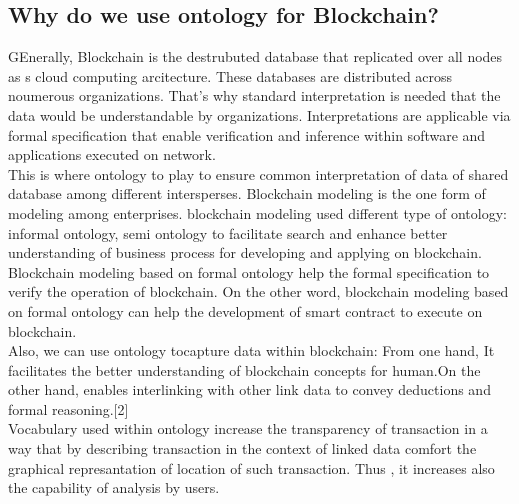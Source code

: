  \subsection{Why do we use ontology for Blockchain?}
 GEnerally, Blockchain is the destrubuted database that replicated over all nodes as s cloud computing arcitecture. These databases are distributed across noumerous organizations. That's why standard interpretation is needed that the data would be understandable by organizations. Interpretations are applicable via formal specification that enable verification and inference within software and applications executed on network. \\
 This is where ontology to play to ensure common interpretation of data of shared database among different intersperses. Blockchain modeling is the one form of modeling among enterprises.
 blockchain modeling used different type of ontology: informal ontology, semi ontology to facilitate search and enhance better understanding of business process for developing and applying on blockchain. Blockchain modeling based on formal ontology help the formal specification to verify the operation of blockchain. On the other word, blockchain modeling based on formal ontology can help the development of smart contract to execute on blockchain.\\
 Also, we can use ontology tocapture data within blockchain: From one hand, It facilitates the better understanding of blockchain concepts for human.On the other hand, enables interlinking with other link data to convey deductions and formal reasoning.[2]\\
 Vocabulary used within ontology increase the transparency of transaction in a way that by describing transaction in the context of linked data comfort the graphical represantation of location of such transaction. Thus , it increases also the capability of analysis by users.
   
